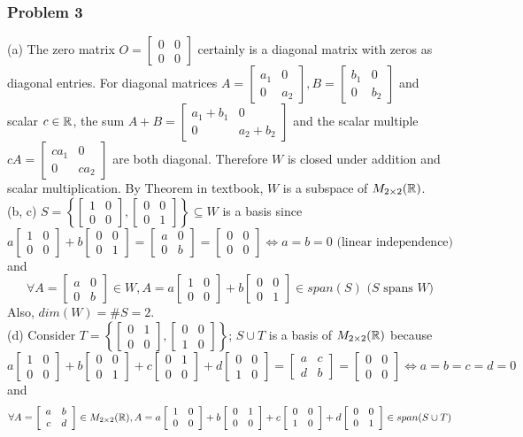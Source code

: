 \documentclass[12pt,a4paper]{article}
\newcommand{\onum}[1]{\raisebox{.5pt}{\textcircled{\raisebox{-1pt} {#1}}}}
\renewcommand{\l}{\left}\renewcommand{\r}{\right}
\newcommand{\ttm}[4]{\l[\begin{array}{cc}{#1}&{#2}\\{#3}&{#4}\end{array}\r]} %
\def\R{\ifmmode\mathbb R\fi}
\begin{document}
\subsubsection*{Problem 3}
(a) \onum1 The zero matrix $O = \ttm 0000$ certainly is a diagonal matrix with zeros as diagonal entries. For diagonal matrices $A = \ttm{a_1}00{a_2}, B = \ttm{b_1}00{b_2}$ and scalar $c\in\R$, \onum2 the sum $A+B = \ttm{a_1+b_1}00{a_2+b_2}$ and \onum3 the scalar multiple $cA = \ttm{ca_1}00{ca_2}$ are both diagonal. Therefore $W$ is closed under addition and scalar multiplication. By Theorem in textbook, $W$ is a subspace of $M_{2\times 2}(\R)$.  \\
(b, c) $S = \l\{\ttm1000,\ttm0001\r\} \subseteq W$ is a basis since 
$$a\ttm1000 + b\ttm0001 = \ttm a00b= \ttm0000 \Leftrightarrow a = b = 0 \mbox{ (linear independence)}$$
and 
$$\forall A = \ttm a00b \in W, A = a\ttm1000 + b\ttm0001 \in span(S)\mbox{ ($S$ spans $W$)}$$
Also, $dim(W) = \#S = 2$.  \\
(d) Consider $T = \l\{\ttm 0100, \ttm0010\r\}$; $S\cup T$ is a basis of $M_{2\times 2}(\R)$ because
$$a\ttm1000 + b\ttm0001 + c\ttm0100 + d\ttm0010= \ttm acdb =\ttm0000 \Leftrightarrow a = b = c = d = 0$$
and 
$$\forall A = \ttm abcd \in M_{2\times2}(\R), A = a\ttm1000 + b\ttm0100 + c\ttm0010+ d\ttm0001 \in span(S\cup T)$$
\end{document}
